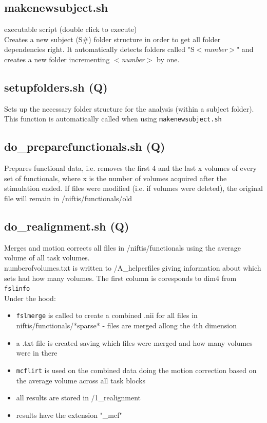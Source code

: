 \documentclass[12pt,a4paper]{scrartcl}
\begin{document}
\subsection{makenewsubject.sh}
executable script (double click to execute)\\

Creates a new subject (S\#) folder structure in order to get all folder dependencies right. It automatically detects folders called "S\textit{$<$number$>$}" and creates a new folder incrementing \textit{$<$number$>$} by one.

\subsection{setupfolders.sh (Q)}
Sets up the necessary folder structure for the analysis (within a subject folder). This function is automatically called when using \texttt{makenewsubject.sh}\\

\subsection{do\_preparefunctionals.sh (Q)}
\label{sec:prepfct}
Prepares functional data, i.e. removes the first 4 and the last x volumes of every set of functionals, where x is the number of volumes acquired after the stimulation ended. If files were modified (i.e. if volumes were deleted), the original file will remain in /niftis/functionals/old\\

\subsection{do\_realignment.sh (Q)}
\label{sec:realign}
Merges and motion corrects all files in /niftis/functionals using the average volume of all task volumes.\\

\noindent numberofvolumes.txt is written to /A\_helperfiles giving information about which sets had how many volumes. The first column is coresponds to dim4 from \texttt{fslinfo}\\

\noindent Under the hood:
\begin{itemize}
\item \texttt{fslmerge} is called to create a combined .nii for all files in niftis/functionals/*sparse* - files are merged allong the 4th dimension
\item a .txt file is created saving which files were merged and how many volumes were in there
\item \texttt{mcflirt} is used on the combined data doing the motion correction based on the average volume across all task blocks
\item all results are stored in /1\_realignment
\item results have the extension "\_mcf"
\end{itemize}
\end{document}
